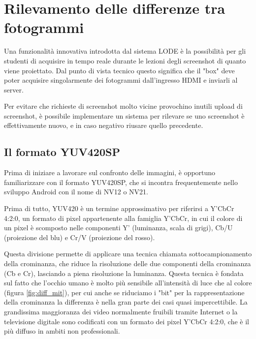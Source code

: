 \chapter{Rilevamento delle differenze tra fotogrammi}
\label{cha:diff}

Una funzionalità innovativa introdotta dal sistema LODE è la possibilità per gli studenti di acquisire in tempo reale durante le lezioni degli screenshot di quanto viene proiettato. Dal punto di vista tecnico questo significa che il "box" deve poter acquisire singolarmente dei fotogrammi dall'ingresso HDMI e inviarli al server.

Per evitare che richieste di screenshot molto vicine provochino inutili upload di screenshot, è possibile implementare un sistema per rilevare se uno screenshot è effettivamente nuovo, e in caso negativo riusare quello precedente.

\section{Il formato YUV420SP}
\label{sec:diff_yuv}

Prima di iniziare a lavorare sul confronto delle immagini, è opportuno familiarizzare con il formato YUV420SP, che si incontra frequentemente nello sviluppo Android con il nome di NV12 o NV21.

Prima di tutto, YUV420 è un termine approssimativo per riferirsi a Y'CbCr 4:2:0, un formato di pixel appartenente alla famiglia Y'CbCr, in cui il colore di un pixel è scomposto nelle componenti Y' (luminanza, scala di grigi\footnotemark{}), Cb/U (proiezione del blu) e Cr/V (proiezione del rosso).\cite{yuv}


Questa divisione permette di applicare una tecnica chiamata sottocampionamento della crominanza, che riduce la risoluzione delle due componenti della crominanza (Cb e Cr), lasciando a piena risoluzione la luminanza. Questa tecnica è fondata sul fatto che l'occhio umano è molto più sensibile all'intensità di luce che al colore (figura \ref{fig:diff_mit}), per cui anche se riduciamo i "bit" per la rappresentazione della crominanza la differenza è nella gran parte dei casi quasi impercettibile.\cite{luminance} La grandissima maggioranza dei video normalmente fruibili tramite Internet o la televisione digitale sono codificati con un formato dei pixel Y'CbCr 4:2:0, che è il più diffuso in ambiti non professionali.

